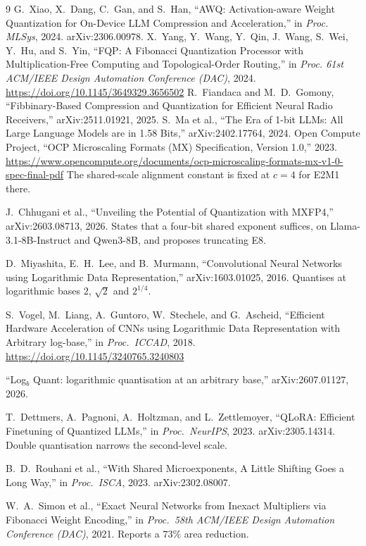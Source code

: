 \documentclass[11pt]{article}
\theoremstyle{definition}
\begin{document}
\begin{thebibliography}{9}
G.~Xiao, X.~Dang, C.~Gan, and S.~Han, ``AWQ: Activation-aware Weight
Quantization for On-Device LLM Compression and Acceleration,'' in
\emph{Proc. MLSys}, 2024. arXiv:2306.00978.
 X.~Yang, Y.~Wang, Y.~Qin, J.~Wang, S.~Wei, Y.~Hu, and S.~Yin,
``FQP: A Fibonacci Quantization Processor with Multiplication-Free Computing and
Topological-Order Routing,'' in \emph{Proc. 61st ACM/IEEE Design Automation
Conference (DAC)}, 2024. \url{https://doi.org/10.1145/3649329.3656502}
 R.~Fiandaca and M.~D.~Gomony, ``Fibbinary-Based Compression
and Quantization for Efficient Neural Radio Receivers,'' arXiv:2511.01921, 2025.
 S.~Ma et al., ``The Era of 1-bit LLMs: All Large Language Models are in 1.58 Bits,'' arXiv:2402.17764, 2024.
 Open Compute Project, ``OCP Microscaling Formats (MX)
Specification, Version 1.0,'' 2023.
\url{https://www.opencompute.org/documents/ocp-microscaling-formats-mx-v1-0-spec-final-pdf}
The shared-scale alignment constant is fixed at $c=4$ for E2M1 there.

 J.~Chhugani et al., ``Unveiling the Potential of Quantization
with MXFP4,'' arXiv:2603.08713, 2026. States that a four-bit shared exponent
suffices, on Llama-3.1-8B-Instruct and Qwen3-8B, and proposes truncating E8.

 D.~Miyashita, E.~H.~Lee, and B.~Murmann, ``Convolutional
Neural Networks using Logarithmic Data Representation,'' arXiv:1603.01025, 2016.
Quantises at logarithmic bases $2$, $\sqrt2$ and $2^{1/4}$.

 S.~Vogel, M.~Liang, A.~Guntoro, W.~Stechele, and G.~Ascheid,
``Efficient Hardware Acceleration of CNNs using Logarithmic Data Representation
with Arbitrary log-base,'' in \emph{Proc.\ ICCAD}, 2018.
\url{https://doi.org/10.1145/3240765.3240803}

 ``Log$_b$ Quant: logarithmic quantisation at an arbitrary
base,'' arXiv:2607.01127, 2026.

 T.~Dettmers, A.~Pagnoni, A.~Holtzman, and L.~Zettlemoyer,
``QLoRA: Efficient Finetuning of Quantized LLMs,'' in \emph{Proc.\ NeurIPS},
2023. arXiv:2305.14314. Double quantisation narrows the second-level scale.

 B.~D.~Rouhani et al., ``With Shared Microexponents, A Little
Shifting Goes a Long Way,'' in \emph{Proc.\ ISCA}, 2023. arXiv:2302.08007.

 W.~A.~Simon et al., ``Exact Neural Networks from Inexact
Multipliers via Fibonacci Weight Encoding,'' in \emph{Proc.\ 58th ACM/IEEE Design
Automation Conference (DAC)}, 2021. Reports a $73\%$ area reduction.


\end{thebibliography}
\end{document}
